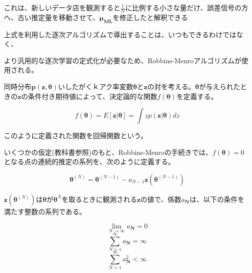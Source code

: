 これは、新しいデータ店を観測すると$\frac{1}{N}$に比例する小さな量だけ、誤差信号の方へ、古い推定量を移動させて、$\bm{\mu_{ML}}$を修正したと解釈できる

上式を利用した逐次アルゴリズムで導出することは、いつもできるわけではなく、

より汎用的な逐次学習の定式化が必要なため、Robbins-Menroアルゴリズムが使用される。

同時分布$\bm{p}(\bm{z}, \bm{\theta})$いしたがくｋアク率変数$\bm{\theta}$と$\bm{z}$の対を考える。$\bm{\theta}$が与えられたときの$\bm{z}$の条件付き期待値によって、決定論的な関数$f(\bm{\theta})$を定義する。

$$ f(\bm{\theta}) = E[\bm{z}|\bm{\theta}] = \int zp(\bm{z}|\bm{\theta})dz $$

このように定義された関数を回帰関数という。

いくつかの仮定(教科書参照)のもと、Robbins-Menroの手続きでは、$f(\bm{\theta})=0$となる点の連続的推定の系列を、次のように定義する。

$$ \bm{\theta}^{(N)} = \bm{\theta}^{(N-1)} - a_{N-1}\bm{z}(\bm{\theta}^{(N-1)})$$

$\bm{z}(\bm{\theta}^{(N)})$は$\bm{\theta}$が$\bm{\theta}^{N}$を取るときに観測される$\bm{z}$の値で、係数$a_{\bm{N}}$は、以下の条件を満たす整数の系列である。

$$\lim_{N \rightarrow \infty}a_{\bm{N}} = 0$$
$$ \sum_{N=1}^\infty a_{\bm{N}} = \infty $$
$$ \sum_{N=1}^\infty a^{2}_{\bm{N}} < \infty $$

\newpage
